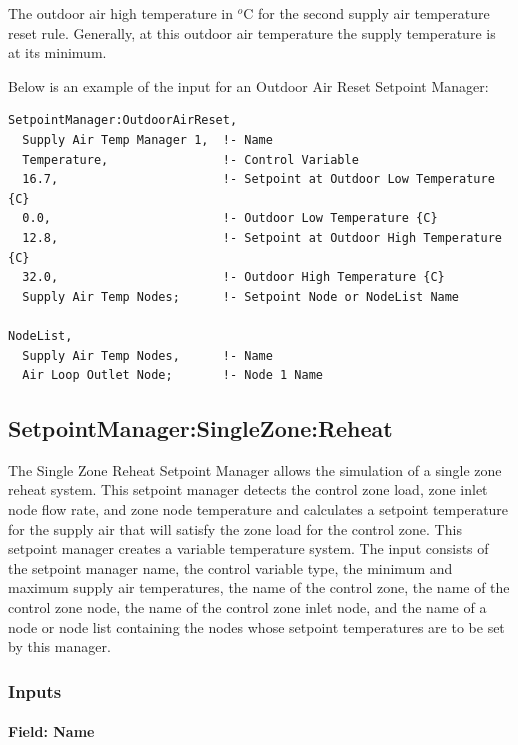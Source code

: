 The outdoor air high temperature in \(^{o}\)C for the second supply air temperature reset rule. Generally, at this outdoor air temperature the supply temperature is at its minimum.

Below is an example of the input for an Outdoor Air Reset Setpoint Manager:

\begin{lstlisting}
SetpointManager:OutdoorAirReset,
  Supply Air Temp Manager 1,  !- Name
  Temperature,                !- Control Variable
  16.7,                       !- Setpoint at Outdoor Low Temperature {C}
  0.0,                        !- Outdoor Low Temperature {C}
  12.8,                       !- Setpoint at Outdoor High Temperature {C}
  32.0,                       !- Outdoor High Temperature {C}
  Supply Air Temp Nodes;      !- Setpoint Node or NodeList Name

NodeList,
  Supply Air Temp Nodes,      !- Name
  Air Loop Outlet Node;       !- Node 1 Name
\end{lstlisting}

\subsection{SetpointManager:SingleZone:Reheat}\label{setpointmanagersinglezonereheat}

The Single Zone Reheat Setpoint Manager allows the simulation of a single zone reheat system. This setpoint manager detects the control zone load, zone inlet node flow rate, and zone node temperature and calculates a setpoint temperature for the supply air that will satisfy the zone load for the control zone. This setpoint manager creates a variable temperature system. The input consists of the setpoint manager name, the control variable type, the minimum and maximum supply air temperatures, the name of the control zone, the name of the control zone node, the name of the control zone inlet node, and the name of a node or node list containing the nodes whose setpoint temperatures are to be set by this manager.

\subsubsection{Inputs}\label{inputs-3-033}

\paragraph{Field: Name}\label{field-name-3-029}

